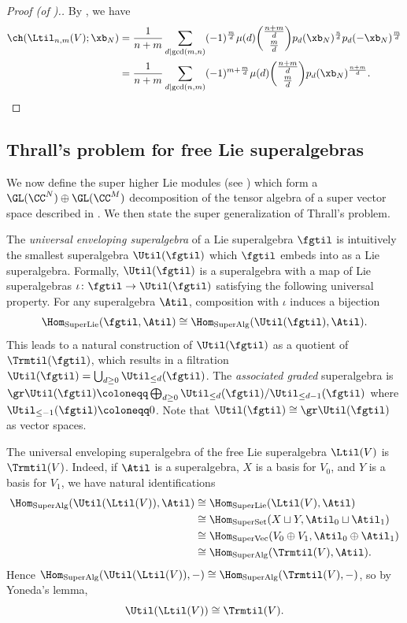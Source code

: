 \begin{proof}[Proof (of ).]
By , we have
\begin{align*}
\ch(\Ltil_{n,m}(V);\xb_N) &= \frac{1}{n+m} \sum_{d \mid \gcd(m,n)} (-1)^\frac{m}{d} \mu(d) \binom{\frac{n+m}{d}}{\frac{m}{d}} p_d(\xb_N)^\frac{n}{d}p_d(-\xb_N)^\frac{m}{d} \\
&= \frac{1}{n+m} \sum_{d \mid \gcd(n,m)} (-1)^{m + \frac{m}{d}} \mu(d) \binom{\frac{n+m}{d}}{\frac{m}{d}} p_d(\xb_N)^\frac{n+m}{d}. \qedhere
\end{align*}
\end{proof}

\subsection{Thrall's problem for free Lie superalgebras}\label{sec:super-Thrall}
We now define the super higher Lie modules (see ) which form a $\GL(\CC^N) \oplus \GL(\CC^M)$ decomposition of the tensor algebra of a super vector space described in . We then state the super generalization of Thrall's problem.

The \textit{universal enveloping superalgebra} of a Lie superalgebra $\fgtil$ is intuitively the smallest superalgebra $\Util(\fgtil)$ which $\fgtil$ embeds into as a Lie superalgebra. Formally, $\Util(\fgtil)$ is a superalgebra with a map of Lie superalgebras $\iota \colon \fgtil \to \Util(\fgtil)$ satisfying the following universal property. For any superalgebra $\Atil$, composition with $\iota$ induces a bijection
  \[ \Hom_{\textrm{SuperLie}}(\fgtil, \Atil) \cong \Hom_{\textrm{SuperAlg}}(\Util(\fgtil), \Atil). \]
This leads to a natural construction of $\Util(\fgtil)$ as a quotient of $\Trmtil(\fgtil)$, which results in a filtration $\Util(\fgtil) = \bigcup_{d \geq 0} \Util_{\leq d}(\fgtil)$. The \textit{associated graded} superalgebra is $\gr \Util(\fgtil) \coloneqq \bigoplus_{d \geq 0} \Util_{\leq d}(\fgtil)/\Util_{\leq d-1}(\fgtil)$ where $\Util_{\leq -1}(\fgtil) \coloneqq 0$. Note that $\Util(\fgtil) \cong \gr \Util(\fgtil)$ as vector spaces.

\begin{exam}\label{ex:U-of-free}
    The universal enveloping superalgebra of the free Lie superalgebra $\Ltil(V)$ is $\Trmtil(V)$. Indeed, if $\Atil$ is a superalgebra, $X$ is a basis for $V_0$, and $Y$ is a basis for $V_1$, we have natural identifications
    \begin{align*}
        \Hom_{\text{SuperAlg}}(\Util(\Ltil(V)), \Atil)
          &\cong \Hom_{\text{SuperLie}}(\Ltil(V), \Atil) \\
          &\cong \Hom_{\text{SuperSet}}(X \sqcup Y, \Atil_0 \sqcup \Atil_1) \\
          &\cong \Hom_{\text{SuperVec}}(V_0 \oplus V_1, \Atil_0 \oplus \Atil_1) \\
          &\cong \Hom_{\text{SuperAlg}}(\Trmtil(V), \Atil).
    \end{align*}
    Hence $\Hom_{\text{SuperAlg}}(\Util(\Ltil(V)), -) \cong \Hom_{\text{SuperAlg}}(\Trmtil(V), -)$, so by Yoneda's lemma,
      \[ \Util(\Ltil(V)) \cong \Trmtil(V). \]
\end{exam}

